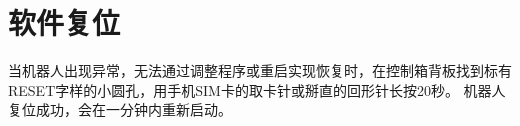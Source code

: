 \chapter{软件复位}

当机器人出现异常，无法通过调整程序或重启实现恢复时，在控制箱背板找到标有{\sf RESET}字样的小圆孔，用手机SIM卡的取卡针或掰直的回形针长按20秒。%
机器人复位成功，会在一分钟内重新启动。

